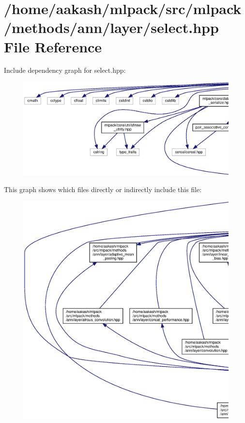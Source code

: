\section{/home/aakash/mlpack/src/mlpack/methods/ann/layer/select.hpp File Reference}
\label{select_8hpp}
Include dependency graph for select.\+hpp\+:
\nopagebreak
\begin{figure}[H]
\begin{center}
\leavevmode
\includegraphics[width=350pt]{select_8hpp__incl}
\end{center}
\end{figure}
This graph shows which files directly or indirectly include this file\+:
\nopagebreak
\begin{figure}[H]
\begin{center}
\leavevmode
\includegraphics[width=350pt]{select_8hpp__dep__incl}
\end{center}
\end{figure}
